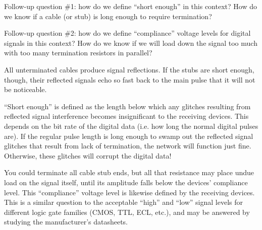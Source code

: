 \vskip 10pt

Follow-up question \#1: how do we define ``short enough'' in this context?  How do we know if a cable (or stub) is long enough to require termination?

\vskip 10pt

Follow-up question \#2: how do we define ``compliance'' voltage levels for digital signals in this context?  How do we know if we will load down the signal too much with too many termination resistors in parallel?







All unterminated cables produce signal reflections.  If the stubs are short enough, though, their reflected signals echo so fast back to the main pulse that it will not be noticeable.

``Short enough'' is defined as the length below which any glitches resulting from reflected signal interference becomes insignificant to the receiving devices.  This depends on the bit rate of the digital data (i.e. how long the normal digital pulses are).  If the regular pulse length is long enough to swamp out the reflected signal glitches that result from lack of termination, the network will function just fine.  Otherwise, these glitches will corrupt the digital data!

\vskip 10pt

You could terminate all cable stub ends, but all that resistance may place undue load on the signal itself, until its amplitude falls below the devices' compliance level.  This ``compliance'' voltage level is likewise defined by the receiving devices.  This is a similar question to the acceptable ``high'' and ``low'' signal levels for different logic gate families (CMOS, TTL, ECL, etc.), and may be answered by studying the manufacturer's datasheets.





